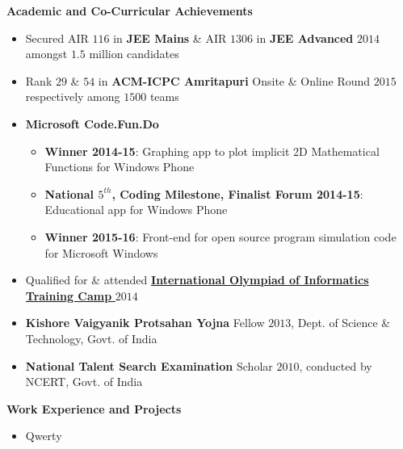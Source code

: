 \documentclass[letterpaper,11pt]{article}
\begin{document}
{\Large{\textbf{Academic and Co-Curricular Achievements}}
\normalsize
\\
\vspace{-5pt}
\begin{itemize}
    \item Secured AIR $116$ in \textbf{JEE Mains} \& AIR $1306$ in \textbf{JEE Advanced} $2014$ amongst $1.5$ million candidates
        \vspace{-5pt}
    \item Rank $29$ \& $54$ in \textbf{ACM-ICPC Amritapuri} Onsite \& Online Round $2015$ respectively among $1500$ teams
        \vspace{-5pt}
    \item \textbf{Microsoft Code.Fun.Do}
        \vspace{-5pt}
        \begin{itemize}
            \item \textbf{Winner 2014-15}: Graphing app to plot implicit 2D Mathematical Functions for Windows Phone
                \vspace{-2pt}
            \item \textbf{National $5^{th}$, Coding Milestone, Finalist Forum 2014-15}: Educational app for Windows Phone\\
                \vspace{-2pt}
            \item \textbf{Winner 2015-16}: Front-end for open source program simulation code for Microsoft Windows
        \end{itemize}
        \vspace{-9pt}
    \item Qualified for \& attended \href{http://www.iarcs.org.in/inoi/2014/inoi2014/results_inoi2014.php}{\textbf{International Olympiad of Informatics Training Camp} $2014$}
        \vspace{-5pt}
    \item \textbf{Kishore Vaigyanik Protsahan Yojna} Fellow $2013$, Dept. of Science \& Technology, Govt. of India
        \vspace{-5pt}
    \item \textbf{National Talent Search Examination} Scholar $2010$, conducted by NCERT, Govt. of India
\end{itemize}
\vspace{-4pt}
\Large{\textbf{Work Experience and Projects}}
\normalsize
\vspace{-6pt}
\begin{itemize}
    \item Qwerty

\end{itemize}}
\end{document}
